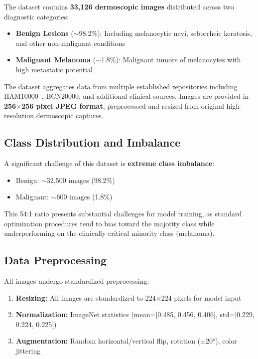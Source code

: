 \documentclass[12pt,a4paper]{article}
\begin{document}
The dataset contains \textbf{33,126 dermoscopic images} distributed across two diagnostic categories:
\begin{itemize}
    \item \textbf{Benign Lesions} ($\sim$98.2\%): Including melanocytic nevi, seborrheic keratosis, and other non-malignant conditions
    \item \textbf{Malignant Melanoma} ($\sim$1.8\%): Malignant tumors of melanocytes with high metastatic potential
\end{itemize}

The dataset aggregates data from multiple established repositories including HAM10000~\cite{tschandl2018}, BCN20000, and additional clinical sources. Images are provided in \textbf{256$\times$256 pixel JPEG format}, preprocessed and resized from original high-resolution dermoscopic captures.

\subsection{Class Distribution and Imbalance}

A significant challenge of this dataset is \textbf{extreme class imbalance}:
\begin{itemize}
    \item Benign: $\sim$32,500 images (98.2\%)
    \item Malignant: $\sim$600 images (1.8\%)
\end{itemize}

This 54:1 ratio presents substantial challenges for model training, as standard optimization procedures tend to bias toward the majority class while underperforming on the clinically critical minority class (melanoma).

\subsection{Data Preprocessing}

All images undergo standardized preprocessing:
\begin{enumerate}
    \item \textbf{Resizing:} All images are standardized to 224$\times$224 pixels for model input
    \item \textbf{Normalization:} ImageNet statistics (mean=[0.485, 0.456, 0.406], std=[0.229, 0.224, 0.225])
    \item \textbf{Augmentation:} Random horizontal/vertical flip, rotation ($\pm$20°), color jittering
\end{enumerate}
\end{document}
